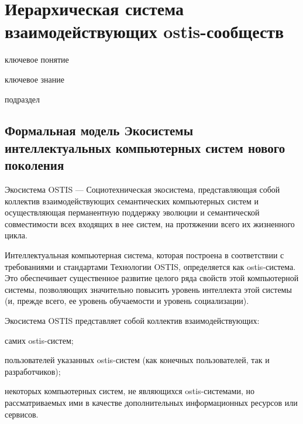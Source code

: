 \section{Иерархическая система взаимодействующих ostis-сообществ}
{\label{sec_ecosystem_structure}} 

\begin{SCn}

\bigskip

\begin{scnrelfromlist}{ключевое понятие}
\end{scnrelfromlist}

\bigskip

\begin{scnrelfromlist}{ключевое знание}
\end{scnrelfromlist}

\bigskip

\begin{scnrelfromlist}{подраздел}
\end{scnrelfromlist}

\end{SCn}


\subsection{Формальная модель Экосистемы интеллектуальных компьютерных систем нового поколения}
{\label{sec_ecosystem_formal_model}} 

Экосистема OSTIS --- Социотехническая экосистема, представляющая собой коллектив взаимодействующих семантических компьютерных систем и осуществляющая перманентную поддержку эволюции и семантической совместимости всех входящих в нее систем, на протяжении всего их жизненного цикла. 

Интеллектуальная компьютерная система, которая построена в соответствии с требованиями и стандартами Технологии OSTIS, определяется как ostis-система. 
Это обеспечивает существенное развитие целого ряда свойств этой компьютерной системы, позволяющих значительно повысить уровень интеллекта этой системы (и, прежде всего, ее уровень обучаемости и уровень социализации). 

Экосистема OSTIS представляет собой коллектив взаимодействующих:
\begin{textitemize}
    \item самих ostis-систем;
    \item пользователей указанных ostis-систем (как конечных пользователей, так и разработчиков);
    \item некоторых компьютерных систем, не являющихся ostis-системами, но рассматриваемых ими в качестве дополнительных информационных ресурсов или сервисов.
\end{textitemize}

